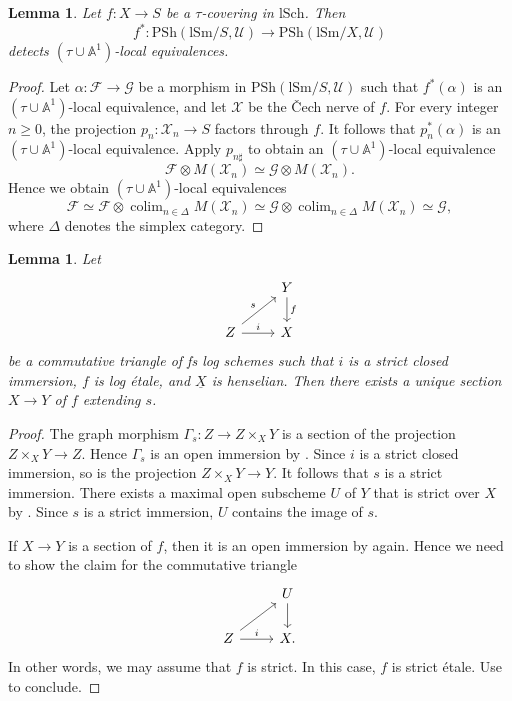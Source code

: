 \documentclass[10pt]{amsart}
\newtheorem{lem}[thm]{Lemma}
\theoremstyle{definition}
\theoremstyle{remark}
\numberwithin{equation}{subsection}
\newcommand{\A}{\mathbb{A}}
\newcommand{\cF}{\mathcal{F}}
\newcommand{\cG}{\mathcal{G}}
\newcommand{\cU}{\mathcal{U}}
\newcommand{\sX}{\mathscr{X}}
\newcommand{\ul}{\underline}
\newcommand{\colimit}{\mathop{\mathrm{colim}}}
\newcommand{\lSch}{\mathrm{lSch}}
\newcommand{\lSm}{\mathrm{lSm}}
\newcommand{\infPsh}{\mathrm{PSh}}
\begin{document}
\begin{lem}
\label{loc.3}
Let $f\colon X\to S$ be a $\tau$-covering in $\lSch$.
Then
\[
f^*\colon \infPsh(\lSm/S,\cU)
\to
\infPsh(\lSm/X,\cU)
\]
detects $(\tau\cup \A^1)$-local equivalences.
\end{lem}
\begin{proof}
Let $\alpha\colon \cF\to \cG$ be a morphism in $\infPsh(\lSm/S,\cU)$ such that $f^*(\alpha)$ is an $(\tau\cup \A^1)$-local equivalence,
and let $\sX$ be the \v{C}ech nerve of $f$.
For every integer $n\geq 0$, the projection $p_n\colon \sX_n\to S$ factors through $f$.
It follows that $p_n^*(\alpha)$ is an $(\tau\cup \A^1)$-local equivalence.
Apply $p_{n\sharp}$ to obtain an $(\tau\cup \A^1)$-local equivalence
\[
\cF\otimes M(\sX_n)
\simeq
\cG\otimes M(\sX_n).
\]
Hence we obtain $(\tau\cup \A^1)$-local equivalences
\[
\cF
\simeq
\cF\otimes \colimit_{n\in \Delta}M(\sX_n)
\simeq
\cG\otimes \colimit_{n\in \Delta}M(\sX_n)
\simeq
\cG,
\]
where $\Delta$ denotes the simplex category.
\end{proof}

\begin{lem}
\label{loc.12}
Let
\[
\begin{tikzcd}
&Y\ar[d,"f"]
\\
Z\ar[ru,"s"]\ar[r,"i"]&
X
\end{tikzcd}
\]
be a commutative triangle of fs log schemes such that $i$ is a strict closed immersion, $f$ is log \'etale, and $\ul{X}$ is henselian.
Then there exists a unique section $X\to Y$ of $f$ extending $s$.
\end{lem}
\begin{proof}
The graph morphism $\Gamma_s\colon Z\to Z\times_X Y$ is a section of the projection $Z\times_X Y\to Z$.
Hence $\Gamma_s$ is an open immersion by \cite[Lemma A.11.2]{logDM}.
Since $i$ is a strict closed immersion, so is the projection $Z\times_X Y\to Y$.
It follows that $s$ is a strict immersion.
There exists a maximal open subscheme $U$ of $Y$ that is strict over $X$ by \cite[Lemma A.4.4]{logDM}.
Since $s$ is a strict immersion, $U$ contains the image of $s$.

If $X\to Y$ is a section of $f$, then it is an open immersion by \cite[Lemma A.11.2]{logDM} again.
Hence we need to show the claim for the commutative triangle
\[
\begin{tikzcd}
&U\ar[d]
\\
Z\ar[ru]\ar[r,"i"]&
X.
\end{tikzcd}
\]
In other words, we may assume that $f$ is strict.
In this case, $f$ is strict \'etale.
Use \cite[Th\'eor\`eme IV.18.5.11(b)]{EGA} to conclude.
\end{proof}
\end{document}
